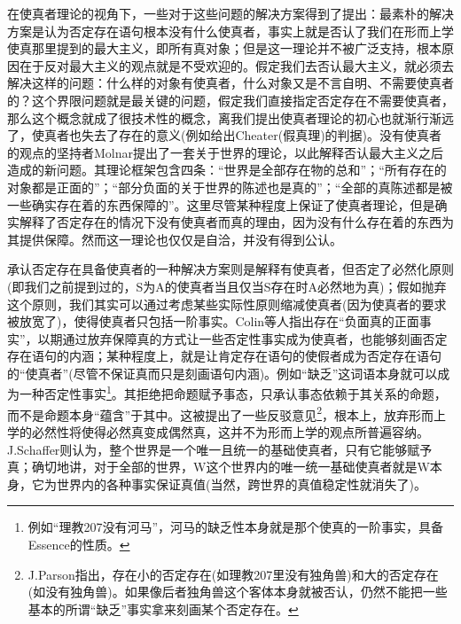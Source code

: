\documentclass{article}
\begin{document}
在使真者理论的视角下，一些对于这些问题的解决方案得到了提出：最素朴的解决方案是认为否定存在语句根本没有什么使真者，事实上就是否认了我们在形而上学使真那里提到的最大主义，即所有真对象；但是这一理论并不被广泛支持，根本原因在于反对最大主义的观点就是不受欢迎的。假定我们去否认最大主义，就必须去解决这样的问题：什么样的对象有使真者，什么对象又是不言自明、不需要使真者的？这个界限问题就是最关键的问题，假定我们直接指定否定存在不需要使真者，那么这个概念就成了很技术性的概念，离我们提出使真者理论的初心也就渐行渐远了，使真者也失去了存在的意义(例如给出Cheater(假真理)的判据)。没有使真者的观点的坚持者Molnar提出了一套关于世界的理论，以此解释否认最大主义之后造成的新问题。其理论框架包含四条：“世界是全部存在物的总和”；“所有存在的对象都是正面的”；“部分负面的关于世界的陈述也是真的”；“全部的真陈述都是被一些确实存在着的东西保障的”。这里尽管某种程度上保证了使真者理论，但是确实解释了否定存在的情况下没有使真者而真的理由，因为没有什么存在着的东西为其提供保障。然而这一理论也仅仅是自洽，并没有得到公认。

承认否定存在具备使真者的一种解决方案则是解释有使真者，但否定了必然化原则(即我们之前提到过的，S为A的使真者当且仅当S存在时A必然地为真)；假如抛弃这个原则，我们其实可以通过考虑某些实际性原则缩减使真者(因为使真者的要求被放宽了)，使得使真者只包括一阶事实。Colin等人指出存在“负面真的正面事实”，以期通过放弃保障真的方式让一些否定性事实成为使真者，也能够刻画否定存在语句的内涵；某种程度上，就是让肯定存在语句的使假者成为否定存在语句的“使真者”(尽管不保证真而只是刻画语句内涵)。例如“缺乏”这词语本身就可以成为一种否定性事实\footnote{例如“理教207没有河马”，河马的缺乏性本身就是那个使真的一阶事实，具备Essence的性质。}。其拒绝把命题赋予事态，只承认事态依赖于其关系的命题，而不是命题本身“蕴含”于其中。这被提出了一些反驳意见\footnote{J.Parson指出，存在小的否定存在(如理教207里没有独角兽)和大的否定存在(如没有独角兽)。如果像后者独角兽这个客体本身就被否认，仍然不能把一些基本的所谓“缺乏”事实拿来刻画某个否定存在。}，根本上，放弃形而上学的必然性将使得必然真变成偶然真，这并不为形而上学的观点所普遍容纳。J.Schaffer则认为，整个世界是一个唯一且统一的基础使真者，只有它能够赋予真；确切地讲，对于全部的世界，W这个世界内的唯一统一基础使真者就是W本身，它为世界内的各种事实保证真值(当然，跨世界的真值稳定性就消失了)。
\end{document}
